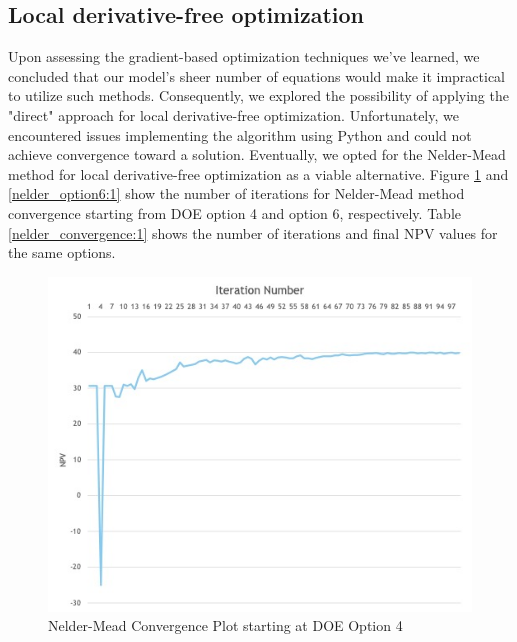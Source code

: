 \documentclass[balance,upint,subscriptcorrection,varvw,mathalfa=cal=boondoxo,spanish,french,vietnamese,russian,greek,pdf-a,colorlinks]{asmeconf}
\begin{document}
\subsection{Local derivative-free optimization}

Upon assessing the gradient-based optimization techniques we've learned, we concluded that our model's sheer number of equations would make it impractical to utilize such methods. Consequently, we explored the possibility of applying the "direct" approach for local derivative-free optimization. Unfortunately, we encountered issues implementing the algorithm using Python and could not achieve convergence toward a solution. Eventually, we opted for the Nelder-Mead method for local derivative-free optimization as a viable alternative. Figure \ref{nelder_option4:1} and \ref{nelder_option6:1} show the number of iterations for Nelder-Mead method convergence starting from DOE option 4 and option 6, respectively. Table \ref{nelder_convergence:1} shows the number of iterations and final NPV values for the same options. 





\begin{figure}
\centering\includegraphics[width=0.7\linewidth]{images/nelder_option4.jpg}
\caption{Nelder-Mead Convergence Plot starting at DOE Option 4}\label{nelder_option4:1}
\end{figure}
 


\end{document}
